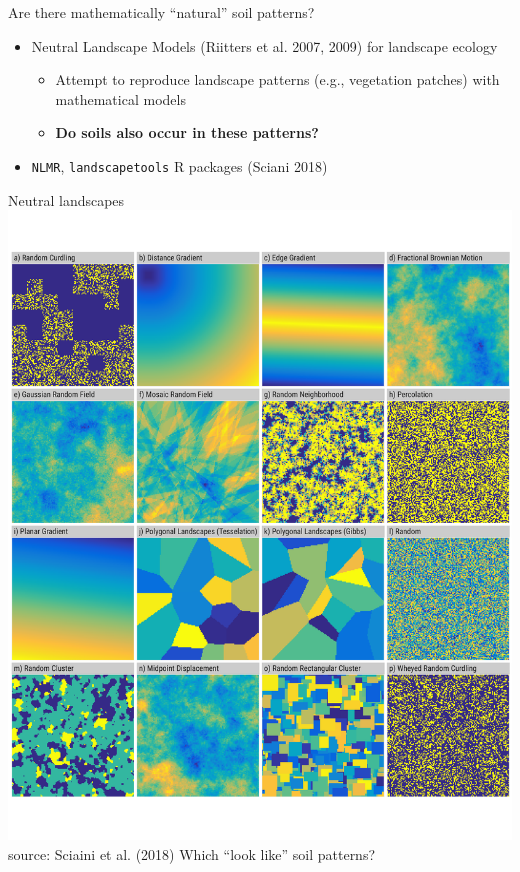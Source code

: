 \documentclass[aspectratio=169]{beamer}
\begin{document}
\begin{frame}{Are there mathematically ``natural'' soil patterns?}
\begin{itemize}
    \item Neutral Landscape Models (Riitters et al. 2007, 2009) for landscape ecology
    \begin{itemize}
        \item Attempt to reproduce landscape patterns (e.g., vegetation patches) with mathematical models
        \item \textbf{Do soils also occur in these patterns?}
    \end{itemize}
    \item \texttt{NLMR}, \texttt{landscapetools} R packages (Sciani 2018)
\end{itemize}
\end{frame}

\begin{frame}{Neutral landscapes}
        \includegraphics[height=0.65
        \textheight]{graphics_david/marcosci-Sciaini_et_al_2018-e3aa0ce_bestiary.pdf}
\\source: Sciaini et al. (2018)
    \hfill
    Which ``look like'' soil patterns?
\end{frame}
\end{document}
